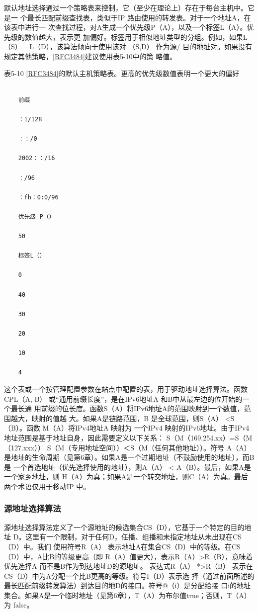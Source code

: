 默认地址选择通过一个策略表来控制，它（至少在理论上）存在于每台主机中。它是一
个最长匹配前缀查找表，类似于IP 路由使用的转发表。对于一个地址A，在该表中进行一
次查找过程，对A生成一个优先级P（A），以及一个标签L（A）。优先级的数值越大，表示更
加偏好。标签用于相似地址类型的分组。例如，如果L（S） =L（D），该算法倾向于使用该对
（S,D） 作为源/ 目的地址对。如果没有规定其他策略，\href{https://www.rfc-editor.org/rfc/rfc3484}{[RFC3484]}建议使用表5-10中的策
略值。

表5-10 \href{https://www.rfc-editor.org/rfc/rfc3484}{[RFC3484]}的默认主机策略表。更高的优先级数值表明一个更大的偏好
\begin{verbatim}
    
    前缀
    
    ：1/128
    
    ：：/0
    
    2002：：/16
    
    ：/96
    
    ：fh：0:0/96
    
    优先级 P（）
    
    50
    
    标签L（）
    
    0
    
    40
    
    30
    
    20
    
    10
    
    4
\end{verbatim}

这个表或一个按管理配置参数在站点中配置的表，用于驱动地址选择算法。函数
CPL（A, B） 或“通用前缀长度”，是在IPv6地址A 和B中从最左边的位开始的一个最长通
用前缀的位长度。函数S（A）将IPv6地址A的范围映射到一个数值，范围越大，映射的值越
大。如果A是链路范围，B 是全球范围，则S（A） <S（B）。函数 M（A）将IPv4地址A 映射为
一个IPv4 映射的IPv6地址。由于IPv4地址范围是基于地址自身，因此需要定义以下关系：
S（M（169.254.xx）=S（M（127.xxx）） S（M（专用地址空间））＜S（M（任何其他地址））。符号
A（A）是地址的生命周期（见第6章）。如果A是一个过期地址（不鼓励使用的地址），而B是
一个首选地址（优先选择使用的地址），则A（A） < A（B）。最后，如果A是一个家乡地址，则
H（A）为真；如果A是一个转交地址，则C（A）为真。最后两个术语仅用于移动IP 中。

\subsubsection{源地址选择算法}
源地址选择算法定义了一个源地址的候选集合CS（D），它基于一个特定的目的地址
D。这里有一个限制，对于任何D，任播、组播和未指定地址从未出现在CS（D）中。我们
使用符号R（A） 表示地址A在集合CS（D）中的等级。在CS（D）中，A比B的等级更高（即
R（A）值更大），表示R（A）>R（B），意味着优先选择A 而不是B作为到达地址D的源地址。
表达式R（A） *>R（B） 表示在CS（D）中为A分配一个比B更高的等级。符号I（D）表示选
择（通过前面所述的最长匹配前缀转发算法）到达目的地D的接口。符号@（i）是分配给接
口i的地址集合。如果A是一个临时地址（见第6章），T（A）为布尔值true；否则，T（A）为
false。


